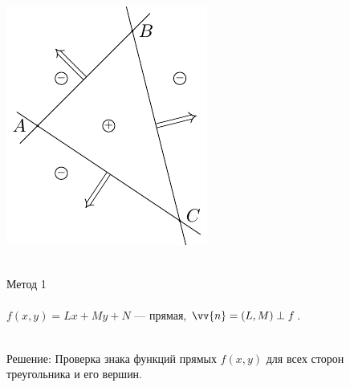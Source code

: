 \documentclass[10pt]{beamer}
\begin{document}
{
	{
		\includegraphics{triangle.pdf} \\ ~ \\
	}
	{
		Метод 1 \\ ~ \\
		
		$f(x,y)=Lx+My+N$ --- прямая, $\vv{n}=(L,M) \perp f$. \\ ~ \\
		
		\pause
		
		Решение: Проверка знака функций прямых $f(x,y)$ для всех сторон треугольника и его вершин.
	}
}
\end{document}
